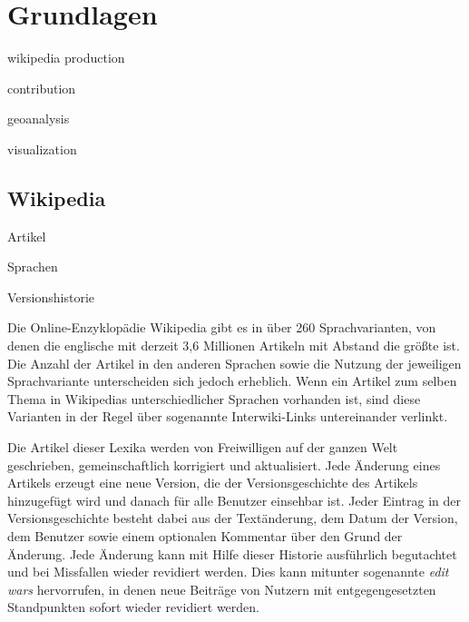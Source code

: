 \chapter{Grundlagen}\label{ch:foundation}

\begin{todos}
    \item wikipedia production
    \item contribution
    \item geoanalysis
    \item visualization
\end{todos}

\section{Wikipedia}


\begin{todos}
    \item Artikel
    \item Sprachen
    \item Versionshistorie
\end{todos}

Die Online-Enzyklopädie Wikipedia gibt es in über 260 Sprachvarianten, von denen die englische mit derzeit 3,6 Millionen Artikeln mit Abstand die größte ist.
Die Anzahl der Artikel in den anderen Sprachen sowie die Nutzung der jeweiligen Sprachvariante unterscheiden sich jedoch erheblich.\cite{wikistats}
Wenn ein Artikel zum selben Thema in Wikipedias unterschiedlicher Sprachen vorhanden ist, sind diese Varianten in der Regel über sogenannte Interwiki-Links untereinander verlinkt.

Die Artikel dieser Lexika werden von Freiwilligen auf der ganzen Welt geschrieben, gemeinschaftlich korrigiert und aktualisiert.
Jede Änderung eines Artikels erzeugt eine neue Version, die der Versionsgeschichte des Artikels hinzugefügt wird und danach für alle Benutzer einsehbar ist.
Jeder Eintrag in der Versionsgeschichte besteht dabei aus der Textänderung, dem Datum der Version, dem Benutzer sowie einem optionalen Kommentar über den Grund der Änderung.
Jede Änderung kann mit Hilfe dieser Historie ausführlich begutachtet und bei Missfallen wieder revidiert werden. 
Dies kann mitunter sogenannte \emph{edit wars} hervorrufen, in denen neue Beiträge von Nutzern mit entgegengesetzten Standpunkten sofort wieder revidiert werden.\cite{suh2007us} 

